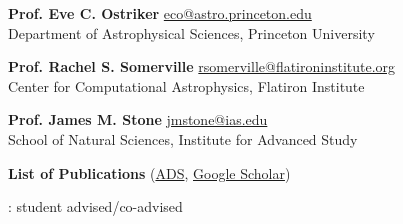 \documentclass[12pt]{article}
\begin{document}

{\small {\bf Prof. Eve C. Ostriker}
\url{eco@astro.princeton.edu}\\
Department of Astrophysical Sciences, Princeton University}


{\small {\bf Prof. Rachel S. Somerville}
\url{rsomerville@flatironinstitute.org}\\
Center for Computational Astrophysics, Flatiron Institute}


{\small {\bf Prof. James M. Stone}
\url{jmstone@ias.edu}\\
School of Natural Sciences, Institute for Advanced Study}


\newpage
\begin{center}
{\large \bf List of Publications}
(\href{\adsurl}{ADS}, \href{\googleurl}{Google Scholar})\\

\end{center}



\begin{itemize}[itemsep=0pt,topsep=\parskip]
\small 
\end{itemize}




{: student advised/co-advised}
\begin{itemize}[itemsep=0pt,topsep=\parskip]
\small 
\end{itemize}





\begin{itemize}[itemsep=0pt,topsep=\parskip]
\small 
\end{itemize}
\end{document}
